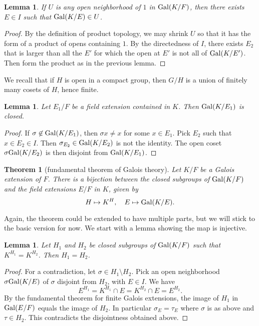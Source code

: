 \documentclass{amsart}
\newtheorem{theorem}[equation]{Theorem}
\newtheorem{lemma}[equation]{Lemma}
\def\oG{\op{Gal}}
\begin{document}
\begin{lemma} If $U$ is any open neighborhood of $1$ in $\oG(K/F)$, then
there exists $E\in I$ such that $\oG(K/E)\in U$.
\end{lemma}

\begin{proof}  By the definition of product topology, we may shrink $U$ so that
it has the form of a product of opens containing $1$.  By the directedness of $I$,
there exists $E_2$ that is larger than all the $E'$ for which the open at $E'$ is not all
of $\oG(K/E')$.  Then form the product as in the previous lemma.
\end{proof}

We recall that if $H$ is open in a compact group, then $G/H$ is a union of finitely
many cosets of $H$, hence finite.

\begin{lemma} Let $E_1/F$ be a field extension contained in $K$.  Then $\oG(K/E_1)$
is closed.
\end{lemma}

\begin{proof}  If $\sigma\not\in \oG(K/E_1)$, then $\sigma x\ne x$ for some
$x\in E_1$.  Pick $E_2$ such that $x\in E_2\in I$.  Then $\sigma_{E_2}\in\oG(K/E_2)$
is not the identity.  The open coset $\sigma \oG(K/E_2)$ is then disjoint
from $\oG(K/E_1)$.
\end{proof}

\begin{theorem}[fundamental theorem of Galois theory] Let $K/F$ be a Galois
extension of $F$.  There is a bijection between the closed subgroups of $\oG(K/F)$
and the field extensions $E/F$ in $K$, given by
\[
H \mapsto K^H,\quad E \mapsto \oG(K/E).
\]
\end{theorem}

Again, the theorem could be extended to have multiple parts, but we will
stick to the basic version for now.
We start with a lemma showing the map is injective.

\begin{lemma}  Let $H_1$ and $H_2$ be closed subgroups of $\oG(K/F)$
such that $K^{H_1}=K^{H_2}$.
Then $H_1 = H_2$.
\end{lemma}

\begin{proof} For a contradiction, let $\sigma\in H_1\setminus H_2$.
Pick an open neighborhood $\sigma \oG(K/E)$ of $\sigma$ disjoint from $H_2$,
with $E\in I$.
We have
\[
E^{H_1} = K^{H_1}\cap E = K^{H_2}\cap E = E^{H_2}.
\]
By the fundamental theorem for finite Galois extensions, the image
of $H_1$ in $\oG(E/F)$ equals the image of $H_2$.
In particular $\sigma_E = \tau_E$ where $\sigma$ is as above and $\tau\in H_2$.
This contradicts the disjointness obtained above.
\end{proof}
\end{document}
